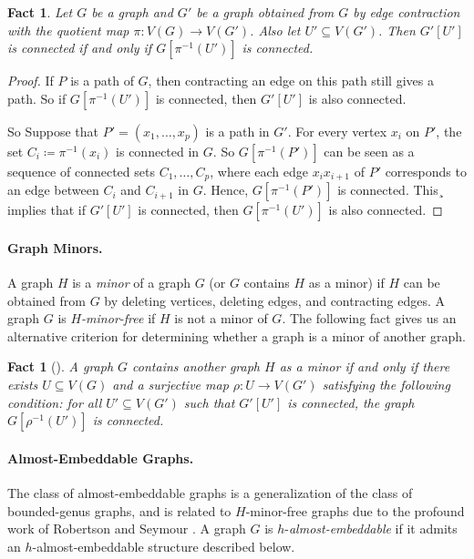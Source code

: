 \documentclass[a4paper,11pt]{article}
\numberwithin{lemma}{section}
\newtheorem{fact}[lemma]{Fact}
\begin{document}
\begin{fact}\label{fact-quotient}
 Let $G$ be a graph and $G'$ be a graph obtained from $G$ by edge contraction with the quotient map $\pi\colon V(G) \rightarrow V(G')$.
 Also let $U' \subseteq V(G')$.
 Then $G'[U']$ is connected if and only if $G[\pi^{-1}(U')]$ is connected.
\end{fact}

\begin{proof}
 If $P$ is a path of $G$, then contracting an edge on this path still gives a path.
 So if $G[\pi^{-1}(U')]$ is connected, then $G'[U']$ is also connected.

 So Suppose that $P' = (x_1,\dots,x_p)$ is a path in $G'$.
 For every vertex $x_i$ on $P'$, the set $C_i \coloneqq \pi^{-1}(x_i)$ is connected in $G$.
 So $G[\pi^{-1}(P')]$ can be seen as a sequence of connected sets $C_1,\dots, C_p$, where each edge $x_ix_{i+1}$ of $P'$ corresponds to an edge between $C_i$ and $C_{i+1}$ in $G$.
 Hence, $G[\pi^{-1}(P')]$ is connected.
 This¸ implies that if $G'[U']$ is connected, then $G[\pi^{-1}(U')]$ is also connected.
\end{proof}

\paragraph{Graph Minors.}
A graph $H$ is a \emph{minor} of a graph $G$ (or $G$ contains $H$ as a minor) if $H$ can be obtained from $G$ by deleting vertices, deleting edges, and contracting edges.
A graph $G$ is \emph{$H$-minor-free} if $H$ is not a minor of $G$.
The following fact gives us an alternative criterion for determining whether a graph is a minor of another graph.

\begin{fact}[\cite{CyganFKLMPPS15}]\label{fact-minormap}
 A graph $G$ contains another graph $H$ as a minor if and only if there exists $U \subseteq V(G)$ and a surjective map $\rho\colon U \to V(G')$ satisfying the following condition: for all $U' \subseteq V(G')$ such that $G'[U']$ is connected, the graph $G[\rho^{-1}(U')]$ is connected.
\end{fact}

\paragraph{Almost-Embeddable Graphs.}
The class of almost-embeddable graphs is a generalization of the class of bounded-genus graphs, and is related to $H$-minor-free graphs due to the profound work of Robertson and Seymour \cite{RobertsonS03a}.
A graph $G$ is $h$-\emph{almost-embeddable} if it admits an $h$-almost-embeddable structure described below.
\end{document}
